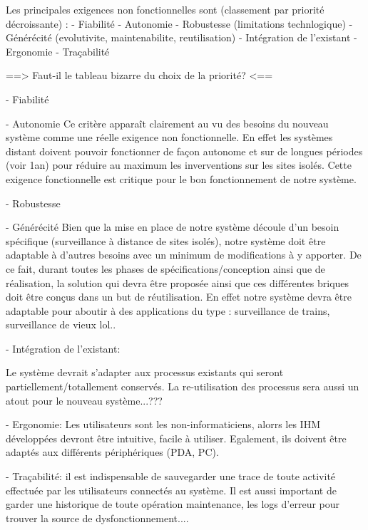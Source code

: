Les principales exigences non fonctionnelles sont (classement par priorité décroissante) : 
- Fiabilité
- Autonomie
- Robustesse (limitations technlogique)
- Générécité (evolutivite, maintenabilite, reutilisation)
- Intégration de l'existant
- Ergonomie
- Traçabilité


==>		Faut-il le tableau bizarre du choix de la priorité?		<==


- Fiabilité

- Autonomie
	Ce critère apparaît clairement au vu des besoins du nouveau système comme une réelle exigence non fonctionnelle.
En effet les systèmes distant doivent pouvoir fonctionner de façon autonome et sur de longues périodes (voir 1an)
pour réduire au maximum les inverventions sur les sites isolés. Cette exigence fonctionnelle est critique pour le bon
fonctionnement de notre système.

- Robustesse

- Générécité
	Bien que la mise en place de notre système découle d'un besoin spécifique (surveillance à distance de sites 
isolés), notre système doit être adaptable à d'autres besoins avec un minimum de modifications à y apporter. De ce 
fait, durant toutes les phases de spécifications/conception ainsi que de réalisation, la solution qui devra être 
proposée ainsi que ces différentes briques doit être conçus dans un but de réutilisation. En effet notre système 
devra être adaptable pour aboutir à des applications du type : surveillance de trains, surveillance de vieux lol..

- Intégration de l'existant:

Le système devrait s'adapter aux processus existants qui seront partiellement/totallement conservés.
La re-utilisation des processus sera aussi un atout pour le nouveau système...???

- Ergonomie:  Les utilisateurs sont les non-informaticiens, alorrs les IHM 
développées devront être intuitive, facile à utiliser. Egalement, ils doivent être adaptés aux
différents périphériques (PDA, PC).   

- Traçabilité: 
il est indispensable de sauvegarder une trace de toute activité effectuée par les utilisateurs connectés
au système. Il est aussi important de garder une historique de toute opération maintenance, les logs d'erreur
pour trouver la source de dysfonctionnement....